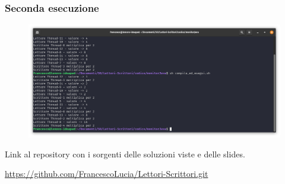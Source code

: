 \documentclass[10pt]{beamer}
\begin{document}
	\begin{frame}[fragile]
		\frametitle{Seconda esecuzione}
		\begin{figure}
			\centering
			\includegraphics[width=1.03\linewidth]{img/esecuzione/programJ2}
			\label{fig:programc1}
		\end{figure}
	\end{frame}
	

	
	
	\begin{frame}
		\centerline{Link al repository con i sorgenti delle soluzioni viste e delle slides.}
		
		\centerline{\href{https://github.com/FrancescoLucia/Lettori-Scrittori.git}{https://github.com/FrancescoLucia/Lettori-Scrittori.git}}
	\end{frame}
	
	
\end{document}
